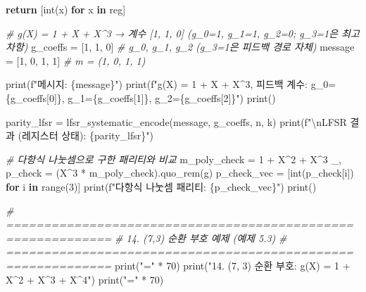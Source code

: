 \documentclass[
  oneside]{article}
\newenvironment{Shaded}{}{}
\newcommand{\BuiltInTok}[1]{\textcolor[rgb]{0.00,0.50,0.00}{#1}}
\newcommand{\CharTok}[1]{\textcolor[rgb]{0.25,0.44,0.63}{#1}}
\newcommand{\CommentTok}[1]{\textcolor[rgb]{0.38,0.63,0.69}{\textit{#1}}}
\newcommand{\ControlFlowTok}[1]{\textcolor[rgb]{0.00,0.44,0.13}{\textbf{#1}}}
\newcommand{\DecValTok}[1]{\textcolor[rgb]{0.25,0.63,0.44}{#1}}
\newcommand{\KeywordTok}[1]{\textcolor[rgb]{0.00,0.44,0.13}{\textbf{#1}}}
\newcommand{\NormalTok}[1]{#1}
\newcommand{\OperatorTok}[1]{\textcolor[rgb]{0.40,0.40,0.40}{#1}}
\newcommand{\SpecialCharTok}[1]{\textcolor[rgb]{0.25,0.44,0.63}{#1}}
\newcommand{\SpecialStringTok}[1]{\textcolor[rgb]{0.73,0.40,0.53}{#1}}
\newcommand{\StringTok}[1]{\textcolor[rgb]{0.25,0.44,0.63}{#1}}
\begin{document}
\begin{Shaded}
\begin{Highlighting}[]
    \ControlFlowTok{return}\NormalTok{ [}\BuiltInTok{int}\NormalTok{(x) }\ControlFlowTok{for}\NormalTok{ x }\KeywordTok{in}\NormalTok{ reg]}

\CommentTok{\# g(X) = 1 + X + X\^{}3 → 계수 [1, 1, 0] (g\_0=1, g\_1=1, g\_2=0; g\_3=1은 최고차항)}
\NormalTok{g\_coeffs }\OperatorTok{=}\NormalTok{ [}\DecValTok{1}\NormalTok{, }\DecValTok{1}\NormalTok{, }\DecValTok{0}\NormalTok{]  }\CommentTok{\# g\_0, g\_1, g\_2 (g\_3=1은 피드백 경로 자체)}
\NormalTok{message }\OperatorTok{=}\NormalTok{ [}\DecValTok{1}\NormalTok{, }\DecValTok{0}\NormalTok{, }\DecValTok{1}\NormalTok{, }\DecValTok{1}\NormalTok{]  }\CommentTok{\# m = (1, 0, 1, 1)}

\BuiltInTok{print}\NormalTok{(}\SpecialStringTok{f"메시지: }\SpecialCharTok{\{}\NormalTok{message}\SpecialCharTok{\}}\SpecialStringTok{"}\NormalTok{)}
\BuiltInTok{print}\NormalTok{(}\SpecialStringTok{f"g(X) = 1 + X + X\^{}3, 피드백 계수: g\_0=}\SpecialCharTok{\{}\NormalTok{g\_coeffs[}\DecValTok{0}\NormalTok{]}\SpecialCharTok{\}}\SpecialStringTok{, g\_1=}\SpecialCharTok{\{}\NormalTok{g\_coeffs[}\DecValTok{1}\NormalTok{]}\SpecialCharTok{\}}\SpecialStringTok{, g\_2=}\SpecialCharTok{\{}\NormalTok{g\_coeffs[}\DecValTok{2}\NormalTok{]}\SpecialCharTok{\}}\SpecialStringTok{"}\NormalTok{)}
\BuiltInTok{print}\NormalTok{()}

\NormalTok{parity\_lfsr }\OperatorTok{=}\NormalTok{ lfsr\_systematic\_encode(message, g\_coeffs, n, k)}
\BuiltInTok{print}\NormalTok{(}\SpecialStringTok{f"}\CharTok{\textbackslash{}n}\SpecialStringTok{LFSR 결과 (레지스터 상태): }\SpecialCharTok{\{}\NormalTok{parity\_lfsr}\SpecialCharTok{\}}\SpecialStringTok{"}\NormalTok{)}

\CommentTok{\# 다항식 나눗셈으로 구한 패리티와 비교}
\NormalTok{m\_poly\_check }\OperatorTok{=} \DecValTok{1} \OperatorTok{+}\NormalTok{ X}\OperatorTok{\^{}}\DecValTok{2} \OperatorTok{+}\NormalTok{ X}\OperatorTok{\^{}}\DecValTok{3}
\NormalTok{\_, p\_check }\OperatorTok{=}\NormalTok{ (X}\OperatorTok{\^{}}\DecValTok{3} \OperatorTok{*}\NormalTok{ m\_poly\_check).quo\_rem(g)}
\NormalTok{p\_check\_vec }\OperatorTok{=}\NormalTok{ [}\BuiltInTok{int}\NormalTok{(p\_check[i]) }\ControlFlowTok{for}\NormalTok{ i }\KeywordTok{in} \BuiltInTok{range}\NormalTok{(}\DecValTok{3}\NormalTok{)]}
\BuiltInTok{print}\NormalTok{(}\SpecialStringTok{f"다항식 나눗셈 패리티:       }\SpecialCharTok{\{}\NormalTok{p\_check\_vec}\SpecialCharTok{\}}\SpecialStringTok{"}\NormalTok{)}
\BuiltInTok{print}\NormalTok{()}

\CommentTok{\# ============================================================}
\CommentTok{\# 14. (7,3) 순환 부호 예제 (예제 5.3)}
\CommentTok{\# ============================================================}
\BuiltInTok{print}\NormalTok{(}\StringTok{"="} \OperatorTok{*} \DecValTok{70}\NormalTok{)}
\BuiltInTok{print}\NormalTok{(}\StringTok{"14. (7, 3) 순환 부호: g(X) = 1 + X\^{}2 + X\^{}3 + X\^{}4"}\NormalTok{)}
\BuiltInTok{print}\NormalTok{(}\StringTok{"="} \OperatorTok{*} \DecValTok{70}\NormalTok{)}


\end{Highlighting}
\end{Shaded}
\end{document}
